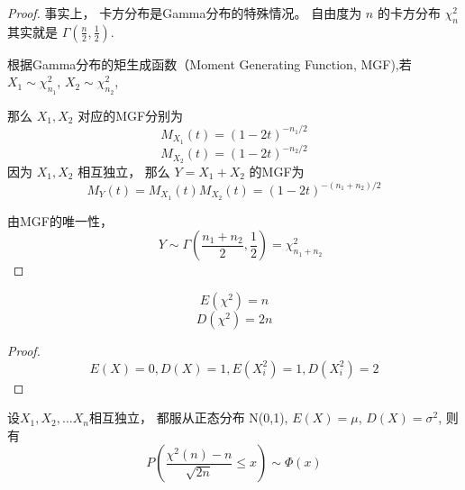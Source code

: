 \begin{proof}
    事实上， 卡方分布是Gamma分布的特殊情况。 自由度为 $ n $ 的卡方分布 $ \chi_{n}^{2} $ 其实就是 $ \Gamma\left(\frac{n}{2}, \frac{1}{2}\right) $.

    根据Gamma分布的矩生成函数（Moment Generating Function, MGF),若$ X_{1} \sim \chi_{n_{1}}^{2} $, $ X_{2} \sim \chi_{n_{2}}^{2} $,

    那么 $ X_{1}, X_{2} $ 对应的MGF分别为
    \begin{equation} M_{X_{1}}(t)=(1-2 t)^{-n_{1} / 2} \end{equation}
    \begin{equation} M_{X_{2}}(t)=(1-2 t)^{-n_{2} / 2} \end{equation}
    因为 $ X_{1}, X_{2} $ 相互独立， 那么 $ Y=X_{1}+X_{2} $ 的MGF为
    \begin{equation} M_{Y}(t)=M_{X_{1}}(t) M_{X_{2}}(t)=(1-2 t)^{-\left(n_{1}+n_{2}\right) / 2} \end{equation}

    由MGF的唯一性，
    \begin{equation} \quad Y \sim \Gamma\left(\frac{n_{1}+n_{2}}{2}, \frac{1}{2}\right)=\chi_{n_{1}+n_{2}}^{2} \end{equation}
\end{proof}

\begin{corollary}
    \begin{equation}E(\chi^2) = n\end{equation}
    \begin{equation}D(\chi^2) = 2n\end{equation}
\end{corollary}

\begin{proof}
    \begin{equation}
        E(X) = 0,
        D(X) = 1,
        E(X_i^2) = 1,
        D(X_i^2) = 2
    \end{equation}
\end{proof}

\begin{corollary}[卡方分布中心极限定理]
    设$X_1,X_2,...X_n$相互独立， 都服从正态分布 N(0,1), $E(X)=\mu$, $D(X)=\sigma^2$, 则有
    \begin{equation}
        P(\frac{\chi^2(n)-n}{\sqrt{2n}} \le x) \sim \Phi(x)
    \end{equation}
\end{corollary}

